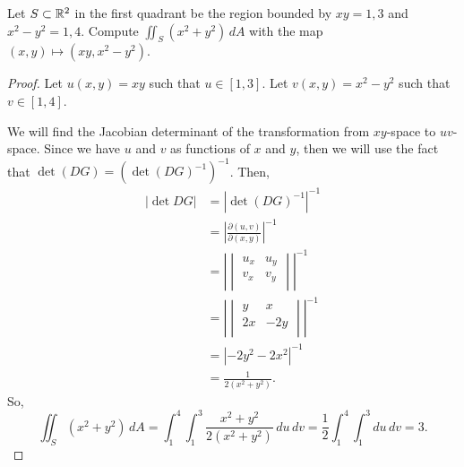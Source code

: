 \documentclass[../hw8]{subfiles}
\begin{document}
\begin{problem}[3]
Let $S\subset \mathbb{R}^2$ in the first quadrant be the region bounded by $xy=1,3$ and  $x^2 - y^2=1,4$.
Compute $\iint_{S}(x^2 + y^2)\,dA$ with the map $(x,y)\mapsto (xy,x^2-y^2)$.
\end{problem}
\begin{proof}
	Let $u(x,y)=xy$ such that $u\in [1,3]$.
	Let $v(x,y)=x^2 - y^2$ such that $v\in [1,4]$.

	We will find the Jacobian determinant of the transformation from $xy$-space to $uv$-space.
	Since we have $u$ and  $v$ as functions of  $x$ and  $y$, then we will use the fact that  $\det{(DG)}={(\det{(DG)^{-1}})}^{-1}$.
	Then, \begin{align*}
		\left| \det{DG} \right| & = {\left| \det{(DG)}^{-1} \right|}^{-1}                       \\
		                        & = {\left| \frac{\partial (u,v)}{\partial (x,y)} \right|}^{-1} \\
		                        & = {\left| \begin{vmatrix}
			                                    u_x & u_y \\ v_x & v_y \\
		                                    \end{vmatrix} \right|}^{-1}                         \\
		                        & = {\left| \begin{vmatrix}
			                                    y & x \\ 2x & -2y \\
		                                    \end{vmatrix} \right| }^{-1}                        \\
		                        & = {\left| -2y^2 - 2x^2\right|}^{-1}                           \\
		                        & = \frac{1}{2(x^2 + y^2)}.
	\end{align*}
	So,  \[
		\iint_S(x^2 + y^2)\,dA = \int_{1}^{4} \int_{1}^{3} \frac{x^2 + y^2}{2(x^2 + y^2)} \,du \,dv = \frac{1}{2}\int_1^4 \int_1^3du\,dv = 3
		.\]
\end{proof}
\end{document}
